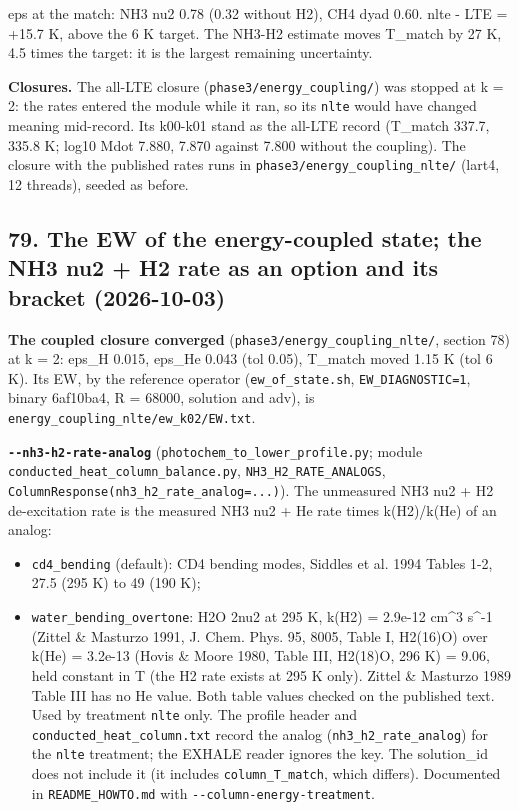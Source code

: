 \documentclass[english,a4paper]{my_memo}
\providecommand{\tightlist}{\setlength{\itemsep}{0pt}\setlength{\parskip}{0pt}}
\begin{document}
eps at the match: NH3 nu2 0.78 (0.32 without H2), CH4 dyad 0.60. nlte -
LTE = +15.7 K, above the 6 K target. The NH3-H2 estimate moves T\_match
by 27 K, 4.5 times the target: it is the largest remaining uncertainty.

\textbf{Closures.} The all-LTE closure (\texttt{phase3/energy\_coupling/}) was stopped
at k = 2: the rates entered the module while it ran, so its \texttt{nlte} would
have changed meaning mid-record. Its k00-k01 stand as the all-LTE record
(T\_match 337.7, 335.8 K; log10 Mdot 7.880, 7.870 against 7.800 without
the coupling). The closure with the published rates runs in
\texttt{phase3/energy\_coupling\_nlte/} (lart4, 12 threads), seeded as before.

\subsection{79. The EW of the energy-coupled state; the NH3 nu2 + H2 rate as an option and its bracket (2026-10-03)}\label{79-the-ew-of-the-energy-coupled-state-the-nh3-nu2--h2-rate-as-an-option-and-its-bracket-2026-10-03}

\textbf{The coupled closure converged} (\texttt{phase3/energy\_coupling\_nlte/}, section
78) at k = 2: eps\_H 0.015, eps\_He 0.043 (tol 0.05), T\_match moved 1.15 K
(tol 6 K). Its EW, by the reference operator (\texttt{ew\_of\_state.sh},
\texttt{EW\_DIAGNOSTIC=1}, binary 6af10ba4, R = 68000, solution and adv), is
\texttt{energy\_coupling\_nlte/ew\_k02/EW.txt}.

\textbf{\texttt{-\/-nh3-h2-rate-analog}} (\texttt{photochem\_to\_lower\_profile.py}; module
\texttt{conducted\_heat\_column\_balance.py}, \texttt{NH3\_H2\_RATE\_ANALOGS},
\texttt{ColumnResponse(nh3\_h2\_rate\_analog=...)}). The unmeasured NH3 nu2 + H2
de-excitation rate is the measured NH3 nu2 + He rate times k(H2)/k(He) of an
analog:

\begin{itemize}
\tightlist
\item
  \texttt{cd4\_bending} (default): CD4 bending modes, Siddles et al. 1994 Tables 1-2,
  27.5 (295 K) to 49 (190 K);
\item
  \texttt{water\_bending\_overtone}: H2O 2nu2 at 295 K, k(H2) = 2.9e-12 cm\^{}3 s\^{}-1
  (Zittel \& Masturzo 1991, J. Chem. Phys. 95, 8005, Table I, H2(16)O) over
  k(He) = 3.2e-13 (Hovis \& Moore 1980, Table III, H2(18)O, 296 K) = 9.06,
  held constant in T (the H2 rate exists at 295 K only). Zittel \& Masturzo
  1989 Table III has no He value. Both table values checked on the
  published text.
  Used by treatment \texttt{nlte} only. The profile header and
  \texttt{conducted\_heat\_column.txt} record the analog (\texttt{nh3\_h2\_rate\_analog}) for the
  \texttt{nlte} treatment; the EXHALE reader ignores the key. The solution\_id does
  not include it (it includes \texttt{column\_T\_match}, which differs). Documented in
  \texttt{README\_HOWTO.md} with \texttt{-\/-column-energy-treatment}.
\end{itemize}
\end{document}
